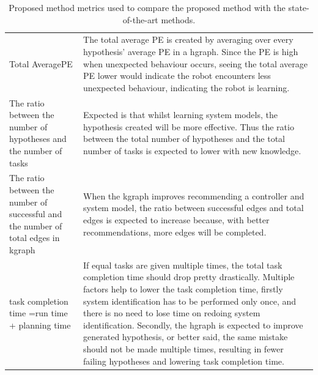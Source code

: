 \noindent
\begin{table}[H]
\centering
\begin{tabular}%
  {>{\raggedright\arraybackslash}p{}%
   >{\raggedright\arraybackslash}p{}}
Total Average\newline \acl{PE} & The total average \ac{PE} is created by averaging over every hypothesis' average \ac{PE} in a \ac{hgraph}. Since the \ac{PE} is high when unexpected behaviour occurs, seeing the total average \ac{PE} lower would indicate the robot encounters less unexpected behaviour, indicating the robot is learning.\\
The ratio between the number of hypotheses and the number of tasks & Expected is that whilst learning system models, the hypothesis created will be more effective. Thus the ratio between the total number of hypotheses and the total number of tasks is expected to lower with new knowledge.\\
The ratio between the number of successful and the number of total edges in \ac{kgraph} & When the \ac{kgraph} improves recommending a controller and system model, the ratio between successful edges and total edges is expected to increase because, with better recommendations, more edges will be completed.\\
task completion time =\newline run time + planning time& If equal tasks are given multiple times, the total task completion time should drop pretty drastically. Multiple factors help to lower the task completion time, firstly system identification has to be performed only once, and there is no need to lose time on redoing system identification. Secondly, the \ac{hgraph} is expected to improve generated hypothesis, or better said, the same mistake should not be made multiple times, resulting in fewer failing hypotheses and lowering task completion time.\\
\end{tabular}
\caption{Proposed method metrics used to compare the proposed method with the state-of-the-art methods.}\label{table:proposed_method_metrics}
\end{table}

